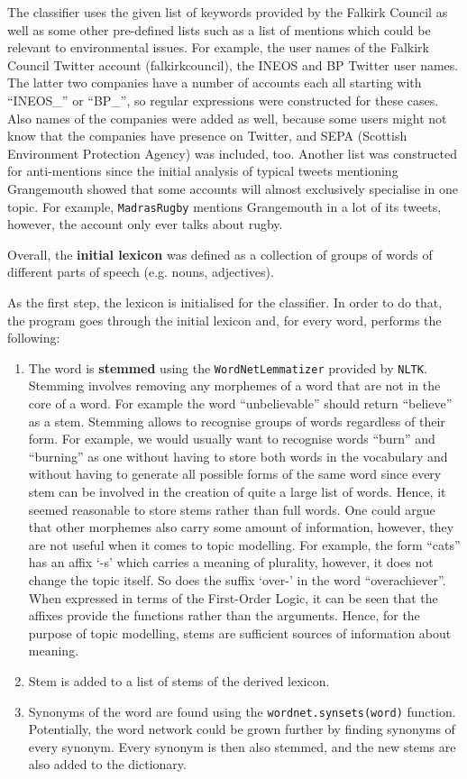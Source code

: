The classifier uses the given list of keywords provided by the Falkirk Council as well as some other pre-defined lists such as a list of mentions which could be relevant to environmental issues. For example, the user names of the Falkirk Council Twitter account (falkirkcouncil), the INEOS and BP Twitter user names. The latter two companies have a number of accounts each all starting with ``INEOS\_'' or ``BP\_'', so regular expressions were constructed for these cases. Also names of the companies were added as well, because some users might not know that the companies have presence on Twitter, and SEPA (Scottish Environment Protection Agency) was included, too. Another list was constructed for anti-mentions since the initial analysis of typical tweets mentioning Grangemouth showed that some accounts will almost exclusively specialise in one topic. For example, \texttt{MadrasRugby} mentions Grangemouth in a lot of its tweets, however, the account only ever talks about rugby.

Overall, the \textbf{initial lexicon} was defined as a collection of groups of words of different parts of speech (e.g. nouns, adjectives). 

As the first step, the lexicon is initialised for the classifier. In order to do that, the program goes through the initial lexicon and, for every word, performs the following:
\begin{enumerate}
    \item The word is \textbf{stemmed} using the \texttt{WordNetLemmatizer} provided by \texttt{NLTK}. Stemming involves removing any morphemes of a word that are not in the core of a word. For example the word ``unbelievable'' should return ``believe'' as a stem. Stemming allows to recognise groups of words regardless of their form. For example, we would usually want to recognise words ``burn'' and ``burning'' as one without having to store both words in the vocabulary and without having to generate all possible forms of the same word since every stem can be involved in the creation of quite a large list of words. Hence, it seemed reasonable to store stems rather than full words. One could argue that other morphemes also carry some amount of information, however, they are not useful when it comes to topic modelling. For example, the form ``cats'' has an affix `-s' which carries a meaning of plurality, however, it does not change the topic itself. So does the suffix `over-' in the word ``overachiever''. When expressed in terms of the First-Order Logic, it can be seen that the affixes provide the functions rather than the arguments. Hence, for the purpose of topic modelling, stems are sufficient sources of information about meaning.
    \item Stem is added to a list of stems of the derived lexicon.
    \item Synonyms of the word are found using the \texttt{wordnet.synsets(word)} function. Potentially, the word network could be grown further by finding synonyms of every synonym. Every synonym is then also stemmed, and the new stems are also added to the dictionary. 
\end{enumerate}
